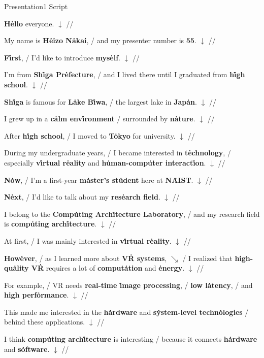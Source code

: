 \documentclass[12pt,a4paper]{ltjsarticle}
\newcommand{\sw}[1]{\textbf{#1}}
\begin{document}
\begin{center}
{\LARGE Presentation1 Script}
\end{center}

\sw{H\.{e}llo} everyone. $\downarrow$ //

My name is \sw{H\.{e}izo N\.{a}kai}, / and my presenter number is \sw{55}. $\downarrow$ //

\sw{F\.{i}rst}, / I'd like to introduce \sw{mys\.{e}lf}. $\downarrow$ //

I'm from \sw{Sh\.{i}ga Pr\.{e}fecture}, / and I lived there until I graduated from \sw{h\.{i}gh school}. $\downarrow$ //

\sw{Sh\.{i}ga} is famous for \sw{L\.{a}ke B\.{i}wa}, / the largest lake in \sw{Jap\.{a}n}. $\downarrow$ //

I grew up in a \sw{c\.{a}lm env\.{i}ronment} / surrounded by \sw{n\.{a}ture}. $\downarrow$ //

After \sw{h\.{i}gh school}, / I moved to \sw{T\.{o}kyo} for university. $\downarrow$ //

During my undergraduate years, / I became interested in \sw{t\.{e}chnology}, / especially \sw{v\.{i}rtual r\.{e}ality} and \sw{h\.{u}man-comp\.{u}ter interact\.{i}on}. $\downarrow$ //

\sw{N\.{o}w}, / I'm a first-year \sw{m\.{a}ster's st\.{u}dent} here at \sw{N\.{A}IST}. $\downarrow$ //

\sw{N\.{e}xt}, / I'd like to talk about my \sw{res\.{e}arch field}. $\downarrow$ //

I belong to the \sw{Comp\.{u}ting Arch\.{i}tecture Laboratory}, / and my research field is \sw{comp\.{u}ting arch\.{i}tecture}. $\downarrow$ //

At first, / I was mainly interested in \sw{v\.{i}rtual r\.{e}ality}. $\downarrow$ //

\sw{How\.{e}ver}, / as I learned more about \sw{V\.{R} systems}, $\searrow$ / I realized that \sw{high-qu\.{a}lity V\.{R}} requires a lot of \sw{comput\.{a}tion} and \sw{\.{e}nergy}. $\downarrow$ //

For example, / VR needs \sw{real-time \.{i}mage processing}, / \sw{low l\.{a}tency}, / and \sw{high perf\.{o}rmance}. $\downarrow$ //

This made me interested in the \sw{h\.{a}rdware} and \sw{s\.{y}stem-level techn\.{o}logies} / behind these applications. $\downarrow$ //

I think \sw{comp\.{u}ting arch\.{i}tecture} is interesting / because it connects \sw{h\.{a}rdware} and \sw{s\.{o}ftware}. $\downarrow$ //
\end{document}
